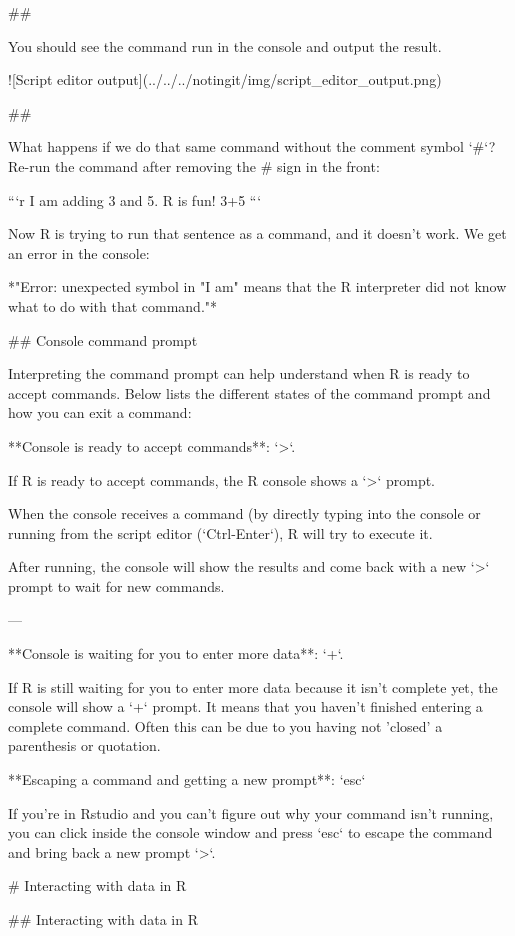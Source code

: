 ##

You should see the command run in the console and output the result.

![Script editor output](../../../notingit/img/script_editor_output.png)
	
## 

What happens if we do that same command without the comment symbol `#`? Re-run the command after removing the # sign in the front:

```r
I am adding 3 and 5. R is fun!
3+5
```

Now R is trying to run that sentence as a command, and it 
doesn't work. We get an error in the console:

*"Error: unexpected symbol in "I am" means that the R interpreter did not know what to do with that command."*


## Console command prompt

Interpreting the command prompt can help understand when R is ready to accept commands. Below lists the different states of the command prompt and how you can exit a command:

**Console is ready to accept commands**: `>`.

If R is ready to accept commands, the R console shows a `>` prompt. 

When the console receives a command (by directly typing into the console or running from the script editor (`Ctrl-Enter`), R will try to execute it.

After running, the console will show the results and come back with a new `>` prompt to wait for new commands.

---

**Console is waiting for you to enter more data**: `+`.

If R is still waiting for you to enter more data because it isn't complete yet,
the console will show a `+` prompt. It means that you haven't finished entering
a complete command. Often this can be due to you having not 'closed' a parenthesis or quotation. 

**Escaping a command and getting a new prompt**: `esc`

If you're in Rstudio and you can't figure out why your command isn't running, you can click inside the console window and press `esc` to escape the command and bring back a new prompt `>`.


# Interacting with data in R

## Interacting with data in R


